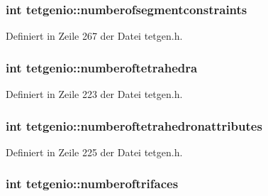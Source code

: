 \hypertarget{classtetgenio_a56142dec4914ffaaf5093c4aaa23b7d4}{
\subsubsection[{numberofsegmentconstraints}]{\setlength{\rightskip}{0pt plus 5cm}int tetgenio\-::numberofsegmentconstraints}}\label{classtetgenio_a56142dec4914ffaaf5093c4aaa23b7d4}


Definiert in Zeile 267 der Datei tetgen.\-h.

\hypertarget{classtetgenio_ad9a3fc307214cd459ca367c55d4bc16d}{
\subsubsection[{numberoftetrahedra}]{\setlength{\rightskip}{0pt plus 5cm}int tetgenio\-::numberoftetrahedra}}\label{classtetgenio_ad9a3fc307214cd459ca367c55d4bc16d}


Definiert in Zeile 223 der Datei tetgen.\-h.

\hypertarget{classtetgenio_ac22e481bf9a3662b173599914a696f7a}{
\subsubsection[{numberoftetrahedronattributes}]{\setlength{\rightskip}{0pt plus 5cm}int tetgenio\-::numberoftetrahedronattributes}}\label{classtetgenio_ac22e481bf9a3662b173599914a696f7a}


Definiert in Zeile 225 der Datei tetgen.\-h.

\hypertarget{classtetgenio_aba0186083c61eb48fca7e80b4a3158f2}{
\subsubsection[{numberoftrifaces}]{\setlength{\rightskip}{0pt plus 5cm}int tetgenio\-::numberoftrifaces}}\label{classtetgenio_aba0186083c61eb48fca7e80b4a3158f2}


